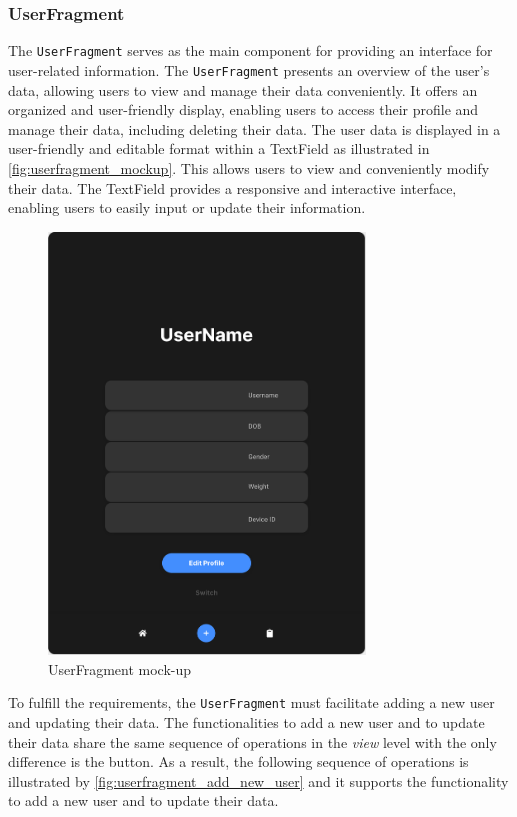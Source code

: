 \subsubsection{UserFragment}
\label{chap:user_design}
The \texttt{UserFragment} serves as the main component for providing an interface for user-related information. 
The \texttt{UserFragment} presents an overview of the user's data, allowing users to view and manage their data conveniently. 
It offers an organized and user-friendly display, enabling users to access their profile and manage their data, including deleting their data.
The user data is displayed in a user-friendly and editable format within a TextField as illustrated in \autoref{fig:userfragment_mockup}. This allows users to view and conveniently modify their data. 
The TextField provides a responsive and interactive interface, enabling users to easily input or update their information. 

\begin{figure}[H]
    \centering
    \includegraphics[width=0.75\textwidth]{images/user-fragment-mockup.png}
    \caption{UserFragment mock-up}
    \label{fig:userfragment_mockup}
\end{figure}

To fulfill the requirements, the \texttt{UserFragment} must facilitate adding a new user and updating their data. The functionalities to add a new user and to update their data share the same sequence of operations in the \emph{view} level with the only difference is the button.
As a result, the following sequence of operations is illustrated by \autoref{fig:userfragment_add_new_user} and it supports the functionality to add a new user and to update their data.

